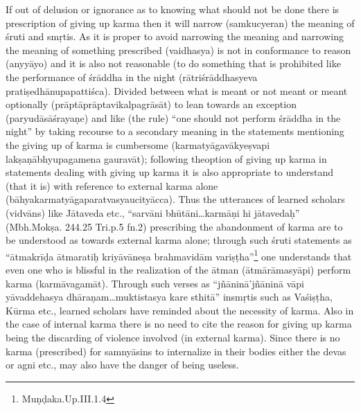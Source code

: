 If out of delusion or ignorance as to knowing what should not be done there is prescription of giving up karma then it will narrow (samkucyeran) the meaning of śruti and smṛtis. As it is proper to avoid narrowing the meaning and narrowing the meaning of something prescribed (vaidhasya) is not in conformance to reason (anyyāyo) and it is also not reasonable (to do something that is prohibited like the performance of śrāddha in the night (rātriśrāddhasyeva pratiṣedhānupapattiśca). Divided between what is meant or not meant or meant optionally (prāptāprāptavikalpagrāsāt) to lean towards an exception (paryudāsāśrayaṇe) and like (the rule) “one should not perform śrāddha in the night” by taking recourse to a secondary meaning in the statements mentioning the giving up of karma is cumbersome (karmatyāgavākyeṣvapi lakṣaṇābhyupagamena gauravāt); following the\break option of giving up karma in statements dealing with giving up karma it is also appropriate to understand (that it is) with reference to external karma alone (bāhyakarmatyāgaparatvasyaucityācca). Thus the utterances of learned scholars (vidvāns) like Jātaveda etc., “sarvāni bhūtāni…karmāṇi hi jātavedaḥ” (Mbh.Mokṣa. 244.25 Tri.p.5 fn.2) prescribing the abandonment of karma are to be understood as towards external karma alone; through such śruti statements as “ātmakrīḍa ātmaratiḥ kriyāvāneṣa brahmavidām variṣṭha”\footnote{Muṇḍaka.Up.III.1.4} one understands that even one who is blissful in the realization of the ātman (ātmārāmasyāpi) perform karma (karmāvagamāt). Through such verses as “jñāninā’\break jñāninā vāpi yāvaddehasya dhāraṇam…muktistasya kare sthitā” in\break smṛtis such as Vaśiṣṭha, Kūrma etc., learned scholars have reminded about the necessity of karma. Also in the case of internal karma there is no need to cite the reason for giving up karma being the discarding of violence involved (in external karma). Since there is no karma (prescribed) for samnyāsins to internalize in their bodies either the devas or agni etc., may also have the danger of being useless. 

\eject


